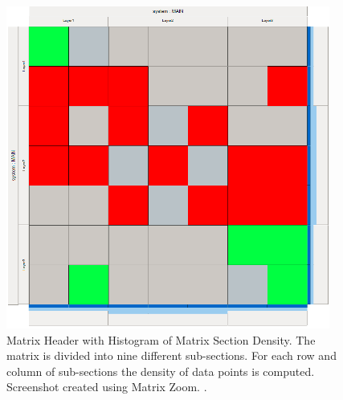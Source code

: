 \begin{figure}[H]
  \centering
  \includegraphics{images/Header_MatrixZoom_histogram.png}
  \caption{Matrix Header with Histogram of Matrix Section Density. The matrix is divided into nine different sub-sections. For each row and column of sub-sections the density of data points is computed. Screenshot created using Matrix Zoom. \citep{ham2005phd}. \label{fig:header_matrixzoom_histogram}}
\end{figure}
